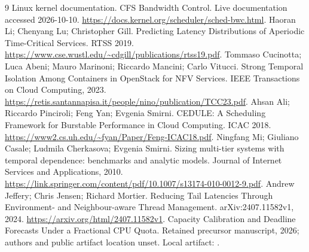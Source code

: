 \documentclass[11pt,a4paper]{article}
\begin{document}
\begin{thebibliography}{9}
 Linux kernel documentation. CFS Bandwidth Control. Live documentation accessed 2026-10-10. \url{https://docs.kernel.org/scheduler/sched-bwc.html}.
 Haoran Li; Chenyang Lu; Christopher Gill. Predicting Latency Distributions of Aperiodic Time-Critical Services. RTSS 2019. \url{https://www.cse.wustl.edu/~cdgill/publications/rtss19.pdf}.
 Tommaso Cucinotta; Luca Abeni; Mauro Marinoni; Riccardo Mancini; Carlo Vitucci. Strong Temporal Isolation Among Containers in OpenStack for NFV Services. IEEE Transactions on Cloud Computing, 2023. \url{https://retis.santannapisa.it/people/nino/publication/TCC23.pdf}.
 Ahsan Ali; Riccardo Pinciroli; Feng Yan; Evgenia Smirni. CEDULE: A Scheduling Framework for Burstable Performance in Cloud Computing. ICAC 2018. \url{https://www2.cs.uh.edu/~fyan/Paper/Feng-ICAC18.pdf}.
 Ningfang Mi; Giuliano Casale; Ludmila Cherkasova; Evgenia Smirni. Sizing multi-tier systems with temporal dependence: benchmarks and analytic models. Journal of Internet Services and Applications, 2010. \url{https://link.springer.com/content/pdf/10.1007/s13174-010-0012-9.pdf}.
 Andrew Jeffery; Chris Jensen; Richard Mortier. Reducing Tail Latencies Through Environment- and Neighbour-aware Thread Management. arXiv:2407.11582v1, 2024. \url{https://arxiv.org/html/2407.11582v1}.
 Capacity Calibration and Deadline Forecasts Under a Fractional CPU Quota. Retained precursor manuscript, 2026; authors and public artifact location unset. Local artifact: .
\end{thebibliography}
\end{document}

